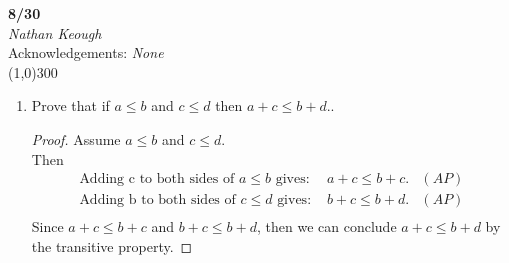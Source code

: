 \documentclass[a4paper]{article}
\begin{document}
    \begin{center}
        \Large \textbf{8/30} \\
        \large \textit{Nathan Keough} \\
        Acknowledgements: \emph{None} \vspace{.5pc} \\ \line(1,0){300} 
        \vspace{1pc}
    \end{center} 
    
    \begin{flushleft}
        \begin{enumerate}
            \item
            Prove that if $a\leq b$ and $c\leq d$ then $a+c\leq b+d$..






            \begin{proof}
                Assume $a\leq b$ and $c\leq d$. \\
                Then 
                \begin{align*}
                    \text{Adding c to both sides of $a \leq b$ gives: }& a + c \leq b + c. & (AP) \\
                    \text{Adding b to both sides of $c \leq d$ gives: }& b + c \leq b + d. & (AP) \\
                \end{align*}
                Since $a + c \leq b + c$ and $b + c \leq b + d$, then we can conclude $a + c \leq b + d$ by the transitive property.
                
            \end{proof}             
        \end{enumerate}
    \end{flushleft}
\end{document}
